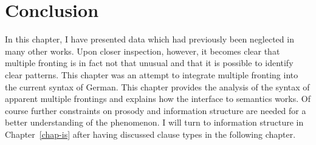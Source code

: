 \section{Conclusion}
\label{sec-zusammenfassung}

In this chapter, I have presented data which had previously been neglected in many other works. Upon
closer inspection, however, it becomes clear that multiple fronting is in fact not that unusual and
that it is possible to identify clear patterns. This chapter was an attempt to integrate multiple
fronting into the current syntax of German. This chapter provides the analysis of the syntax of
apparent multiple frontings and explains how the interface to semantics works. Of course further
constraints on prosody and information structure are needed for a better understanding of the
phenomenon. I will turn to information structure in Chapter~\ref{chap-is} after having discussed clause types
in the following chapter.




